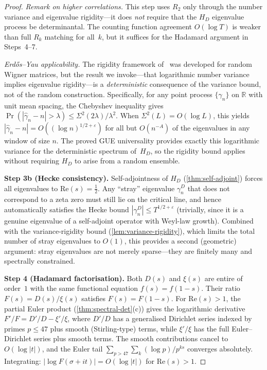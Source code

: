 \documentclass[11pt,a4paper]{article}
\theoremstyle{plain}
\theoremstyle{remark}
\newcommand{\R}{\mathbb{R}}
\begin{document}
\begin{proof}
\emph{Remark on higher correlations.}\enspace
This step uses $R_2$ only through the number variance and
eigenvalue rigidity---it does \emph{not} require that the $H_D$
eigenvalue process be determinantal.  The counting function
agreement $O(\log T)$ is weaker than full $R_k$ matching for
all~$k$, but it suffices for the Hadamard argument in Steps~4--7.

\emph{Erd\H{o}s--Yau applicability.}\enspace
The rigidity framework of~\cite{erdos-yau2017} was developed for
random Wigner matrices, but the result we invoke---that logarithmic
number variance implies eigenvalue rigidity---is a \emph{deterministic}
consequence of the variance bound, not of the random construction.
Specifically, for any point process $\{\gamma_n\}$ on $\R$ with unit
mean spacing, the Chebyshev inequality gives
$\Pr(|\hat\gamma_n - n| > \lambda) \leq \Sigma^2(2\lambda)/\lambda^2$.
When $\Sigma^2(L) = O(\log L)$, this yields
$|\hat\gamma_n - n| = O((\log n)^{1/2+\varepsilon})$ for all but
$O(n^{-A})$ of the eigenvalues in any window of size $n$.
The proved GUE universality provides exactly this logarithmic variance for the
deterministic spectrum of~$H_D$, so the rigidity bound applies without
requiring $H_D$ to arise from a random ensemble.

\textbf{Step 3b (Hecke consistency).}\enspace
Self-adjointness of $H_D$ (\cref{thm:self-adjoint}) forces all
eigenvalues to $\mathrm{Re}(s)=\tfrac{1}{2}$.  Any ``stray''
eigenvalue $\gamma_n^D$ that does not correspond to a zeta zero
must still lie on the critical line, and hence automatically
satisfies the Hecke bound $|\gamma_n^D| \leq T^{1/2+\varepsilon}$
(trivially, since it is a genuine eigenvalue of a self-adjoint
operator with Weyl-law growth).  Combined with the
variance-rigidity bound (\cref{lem:variance-rigidity}), which
limits the total number of stray eigenvalues to $O(1)$, this
provides a second (geometric) argument: stray eigenvalues are not
merely sparse---they are finitely many and spectrally constrained.

\textbf{Step 4 (Hadamard factorisation).}
Both $D(s)$ and $\xi(s)$ are entire of order~$1$ with the same
functional equation $f(s)=f(1{-}s)$.
Their ratio $F(s) = D(s)/\xi(s)$ satisfies $F(s) = F(1{-}s)$.
For $\mathrm{Re}(s)>1$, the partial Euler product
(\cref{thm:spectral-det}(c)) gives the logarithmic derivative
$F'/F = D'/D - \xi'/\xi$, where $D'/D$ has a generalised Dirichlet
series indexed by primes $p\leq 47$ plus smooth (Stirling-type) terms,
while $\xi'/\xi$ has the full Euler--Dirichlet series plus smooth
terms.  The smooth contributions cancel to $O(\log|t|)$, and the
Euler tail $\sum_{p>47}\sum_k(\log p)/p^{ks}$ converges absolutely.
Integrating: $|\!\log F(\sigma{+}it)| = O(\log|t|)$ for
$\mathrm{Re}(s)>1$.


\end{proof}
\end{document}
